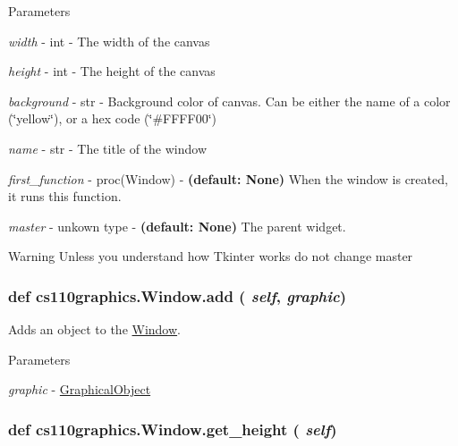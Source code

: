 \begin{DoxyParams}{Parameters}
\item[{\em width}]-\/ int -\/ The width of the canvas \item[{\em height}]-\/ int -\/ The height of the canvas \item[{\em background}]-\/ str -\/ Background color of canvas. Can be either the name of a color (\char`\"{}yellow\char`\"{}), or a hex code (\char`\"{}\#FFFF00\char`\"{}) \item[{\em name}]-\/ str -\/ The title of the window \item[{\em first\_\-function}]-\/ proc(Window) -\/ {\bfseries (default: None)} When the window is created, it runs this function. \item[{\em master}]-\/ unkown type -\/ {\bfseries (default: None)} The parent widget. \end{DoxyParams}
\begin{DoxyWarning}{Warning}
Unless you understand how Tkinter works do not change master 
\end{DoxyWarning}
\hypertarget{classcs110graphics_1_1Window_a34064de02d5149841a23764e78085d18}{
\subsubsection[{add}]{\setlength{\rightskip}{0pt plus 5cm}def cs110graphics.Window.add ( {\em self}, \/   {\em graphic})}}
\label{classcs110graphics_1_1Window_a34064de02d5149841a23764e78085d18}


Adds an object to the \hyperlink{classcs110graphics_1_1Window}{Window}. 
\begin{DoxyParams}{Parameters}
\item[{\em graphic}]-\/ \hyperlink{classcs110graphics_1_1GraphicalObject}{GraphicalObject} \end{DoxyParams}
\hypertarget{classcs110graphics_1_1Window_a2ab7070110bd58c95e8f29c10d71c7cc}{
\subsubsection[{get\_\-height}]{\setlength{\rightskip}{0pt plus 5cm}def cs110graphics.Window.get\_\-height ( {\em self})}}
\label{classcs110graphics_1_1Window_a2ab7070110bd58c95e8f29c10d71c7cc}


